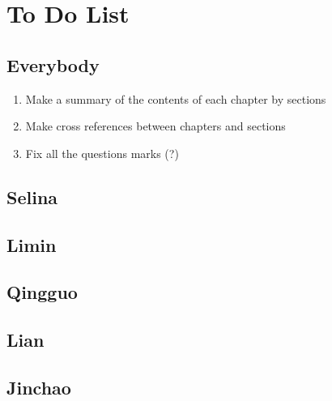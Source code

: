 \chapter{To Do List}

\section{Everybody}
\begin{enumerate}
\item Make a summary of the contents of each chapter by sections
\item Make cross references between chapters and sections
\item Fix all the questions marks (?) 
\end{enumerate}
\section{Selina}

\section{Limin}

\section{Qingguo}

\section{Lian}

\section{Jinchao}

